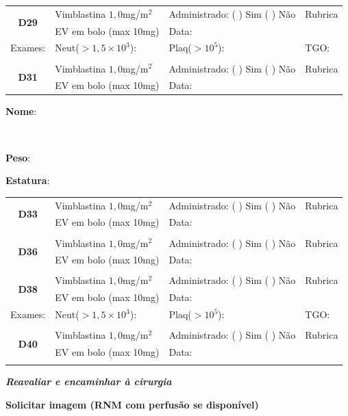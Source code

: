 \documentclass[11pt,a4paper,oldfontcommands]{memoir}
\def\entrywithlabel[#1]#2{\parbox{#1}{{\small #2:} \hrulefill}}
\begin{document}
\begin{center}
\begin{table}[H]
\begin{tabular}{p{1.3cm}p{5cm}|p{5cm}|p{3cm}}
    \\
   \hline
          \multicolumn{1}{c|}{\multirow{2}{*}{\textbf{D29}}}&{Vimblastina \(1,0\)mg/m\(^2\)}&{Administrado: (  ) Sim (  ) Não}&{Rubrica}\\
    \multicolumn{1}{c|}{}&{EV em bolo (max 10mg)}&{Data:}&\\
    \hline
    {Exames:}&{Neut(\(>1,5\times10^3\)):}&{Plaq(\(>10^5\)):}&{TGO:}
    \\
    \hline
    \\
    \hline
    \multicolumn{1}{c|}{\multirow{2}{*}{\textbf{D31}}}&{Vimblastina \(1,0\)mg/m\(^2\)}&{Administrado: (  ) Sim (  ) Não}&{Rubrica}\\
    \multicolumn{1}{c|}{}&{EV em bolo (max 10mg)}&{Data:}&\\
    \hline
\end{tabular}
\end{table}

\pagebreak
    \noindent
\entrywithlabel[1\hsize]{\textbf{Nome}}\hfill
\\[0.3cm]
\entrywithlabel[.45\hsize]{\textbf{Peso}}\hfill  \entrywithlabel[.45\hsize]{\textbf{Estatura}}

\begin{table}[H]
\begin{tabular}{p{1.3cm}p{5cm}|p{5cm}|p{3cm}}
    \hline
    \multicolumn{1}{c|}{\multirow{2}{*}{\textbf{D33}}}&{Vimblastina \(1,0\)mg/m\(^2\)}&{Administrado: (  ) Sim (  ) Não}&{Rubrica}\\
    \multicolumn{1}{c|}{}&{EV em bolo (max 10mg)}&{Data:}&\\
    \hline
    \\
    \hline
    \multicolumn{1}{c|}{\multirow{2}{*}{\textbf{D36}}}&{Vimblastina \(1,0\)mg/m\(^2\)}&{Administrado: (  ) Sim (  ) Não}&{Rubrica}\\
    \multicolumn{1}{c|}{}&{EV em bolo (max 10mg)}&{Data:}&\\
    \hline
    \\
    \hline
    \multicolumn{1}{c|}{\multirow{2}{*}{\textbf{D38}}}&{Vimblastina \(1,0\)mg/m\(^2\)}&{Administrado: (  ) Sim (  ) Não}&{Rubrica}\\
    \multicolumn{1}{c|}{}&{EV em bolo (max 10mg)}&{Data:}&\\
    \hline
    {Exames:}&{Neut(\(>1,5\times10^3\)):}&{Plaq(\(>10^5\)):}&{TGO:}
    \\
    \hline
    \\
    \hline
    \multicolumn{1}{c|}{\multirow{2}{*}{\textbf{D40}}}&{Vimblastina \(1,0\)mg/m\(^2\)}&{Administrado: (  ) Sim (  ) Não}&{Rubrica}\\
    \multicolumn{1}{c|}{}&{EV em bolo (max 10mg)}&{Data:}&\\
    \hline
    \\
   \hline
\end{tabular}
\end{table}
\textbf{\textit{Reavaliar e encaminhar à cirurgia}}

\textbf{Solicitar imagem (RNM com perfusão se disponível)}
\end{center}
\end{document}
